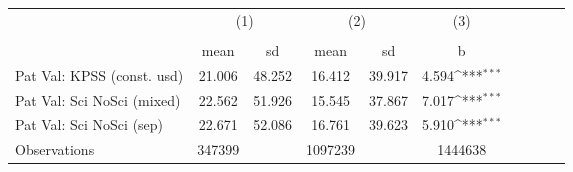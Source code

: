 {
\def\sym#1{\ifmmode^{#1}\else\(^{#1}\)\fi}
\begin{tabular}{l*{3}{ccc}}
\hline\hline
                    &\multicolumn{2}{c}{(1)}  &\multicolumn{2}{c}{(2)}  &\multicolumn{1}{c}{(3)}\\
                    &\multicolumn{2}{c}{}     &\multicolumn{2}{c}{}     &\multicolumn{1}{c}{} \\
                    &        mean&          sd&        mean&          sd&           b         \\
\hline
Pat Val: KPSS (const. usd)&      21.006&      48.252&      16.412&      39.917&       4.594\sym{***}\\
Pat Val: Sci NoSci (mixed)&      22.562&      51.926&      15.545&      37.867&       7.017\sym{***}\\
Pat Val: Sci NoSci (sep)&      22.671&      52.086&      16.761&      39.623&       5.910\sym{***}\\
\hline
Observations        &      347399&            &     1097239&            &     1444638         \\
\hline\hline
\end{tabular}
}
